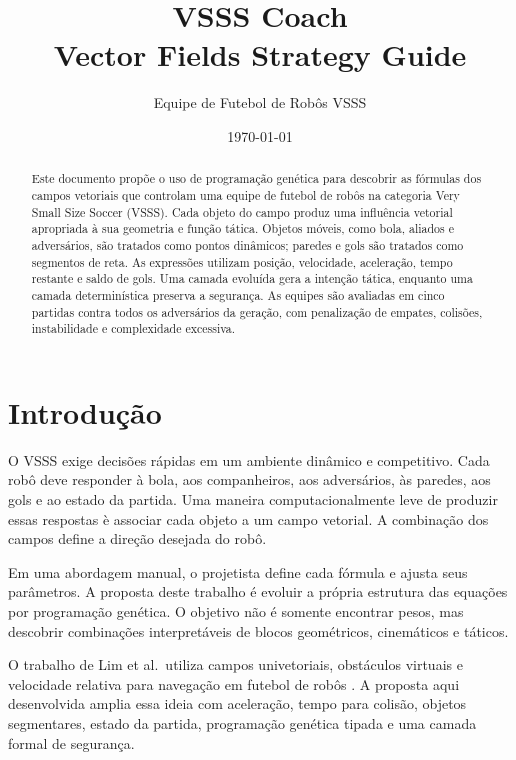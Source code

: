 \documentclass[12pt,a4paper]{article}
\title{\textbf{VSSS Coach}\\[0.3cm]\large Vector Fields Strategy Guide}
\author{Equipe de Futebol de Rob\^os VSSS}
\date{\today}
\begin{document}
\maketitle

\begin{abstract}
Este documento prop\~oe o uso de programa\c{c}\~ao gen\'etica para descobrir as f\'ormulas dos campos vetoriais que controlam uma equipe de futebol de rob\^os na categoria Very Small Size Soccer (VSSS). Cada objeto do campo produz uma influ\^encia vetorial apropriada \`a sua geometria e fun\c{c}\~ao t\'atica. Objetos m\'oveis, como bola, aliados e advers\'arios, s\~ao tratados como pontos din\^amicos; paredes e gols s\~ao tratados como segmentos de reta. As express\~oes utilizam posi\c{c}\~ao, velocidade, acelera\c{c}\~ao, tempo restante e saldo de gols. Uma camada evolu\'ida gera a inten\c{c}\~ao t\'atica, enquanto uma camada determin\'istica preserva a seguran\c{c}a. As equipes s\~ao avaliadas em cinco partidas contra todos os advers\'arios da gera\c{c}\~ao, com penaliza\c{c}\~ao de empates, colis\~oes, instabilidade e complexidade excessiva.
\end{abstract}

\tableofcontents
\newpage

\section{Introdu\c{c}\~ao}

O VSSS exige decis\~oes r\'apidas em um ambiente din\^amico e competitivo. Cada rob\^o deve responder \`a bola, aos companheiros, aos advers\'arios, \`as paredes, aos gols e ao estado da partida. Uma maneira computacionalmente leve de produzir essas respostas \`e associar cada objeto a um campo vetorial. A combina\c{c}\~ao dos campos define a dire\c{c}\~ao desejada do rob\^o.

Em uma abordagem manual, o projetista define cada f\'ormula e ajusta seus par\^ametros. A proposta deste trabalho \'e evoluir a pr\'opria estrutura das equa\c{c}\~oes por programa\c{c}\~ao gen\'etica. O objetivo n\~ao \'e somente encontrar pesos, mas descobrir combina\c{c}\~oes interpret\'aveis de blocos geom\'etricos, cinem\'aticos e t\'aticos.

O trabalho de Lim et al.\ utiliza campos univetoriais, obst\'aculos virtuais e velocidade relativa para navega\c{c}\~ao em futebol de rob\^os \cite{lim2008}. A proposta aqui desenvolvida amplia essa ideia com acelera\c{c}\~ao, tempo para colis\~ao, objetos segmentares, estado da partida, programa\c{c}\~ao gen\'etica tipada e uma camada formal de seguran\c{c}a.
\end{document}
